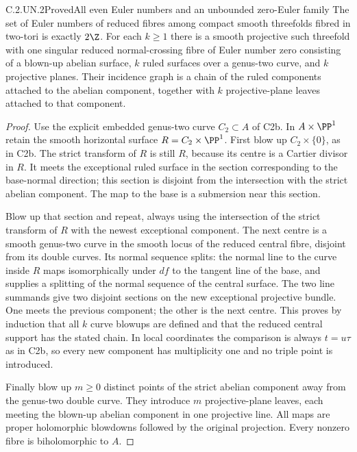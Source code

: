 \begin{statement}{C.2.UN.2}{Proved}{All even Euler numbers and an unbounded zero-Euler family}
The set of Euler numbers of reduced fibres among compact smooth
threefolds fibred in two-tori is exactly $2\Z$. For each $k\ge1$
there is a smooth projective such threefold with one singular reduced
normal-crossing fibre of Euler number zero consisting of a blown-up
abelian surface, $k$ ruled surfaces over a genus-two curve, and $k$
projective planes. Their incidence graph is a chain of the ruled
components attached to the abelian component, together with $k$
projective-plane leaves attached to that component.
\end{statement}
\begin{proof}
Use the explicit embedded genus-two curve $C_2\subset A$ of C2b.
In $A\times\PP^1$ retain the smooth horizontal surface
$R=C_2\times\PP^1$. First blow up $C_2\times\{0\}$, as in C2b.
The strict transform of $R$ is still $R$, because its centre is a
Cartier divisor in $R$. It meets the exceptional ruled surface in
the section corresponding to the base-normal direction; this
section is disjoint from the intersection with the strict abelian
component. The map to the base is a submersion near this section.

Blow up that section and repeat, always using the intersection of
the strict transform of $R$ with the newest exceptional component.
The next centre is a smooth genus-two curve in the smooth locus of
the reduced central fibre, disjoint from its double curves. Its
normal sequence splits: the normal line to the curve inside $R$
maps isomorphically under $df$ to the tangent line of the base,
and supplies a splitting of the normal sequence of the central
surface. The two line summands give two disjoint sections on the
new exceptional projective bundle. One meets the previous
component; the other is the next centre. This proves by induction
that all $k$ curve blowups are defined and that the reduced central
support has the stated chain. In local coordinates the comparison
is always $t=u\tau$ as in C2b, so every new component has
multiplicity one and no triple point is introduced.

Finally blow up $m\ge0$ distinct points of the strict abelian
component away from the genus-two double curve. They introduce
$m$ projective-plane leaves, each meeting the blown-up abelian
component in one projective line. All maps are proper holomorphic
blowdowns followed by the original projection. Every nonzero
fibre is biholomorphic to $A$.


\end{proof}
